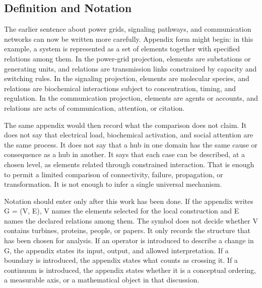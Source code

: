 \documentclass[11pt,a4paper,openany]{book}
\begin{document}
\subsection{Definition and Notation}
The earlier sentence about power grids, signaling pathways, and communication networks can now be written more carefully. Appendix form might begin: in this example, a system is represented as a set of elements together with specified relations among them. In the power-grid projection, elements are substations or generating units, and relations are transmission links constrained by capacity and switching rules. In the signaling projection, elements are molecular species, and relations are biochemical interactions subject to concentration, timing, and regulation. In the communication projection, elements are agents or accounts, and relations are acts of communication, attention, or citation. \cite{raf_networks,bak_soc}\par
The same appendix would then record what the comparison does not claim. It does not say that electrical load, biochemical activation, and social attention are the same process. It does not say that a hub in one domain has the same cause or consequence as a hub in another. It says that each case can be described, at a chosen level, as elements related through constrained interaction. That is enough to permit a limited comparison of connectivity, failure, propagation, or transformation. It is not enough to infer a single universal mechanism.\par
Notation should enter only after this work has been done. If the appendix writes G = (V, E), V names the elements selected for the local construction and E names the declared relations among them. The symbol does not decide whether V contains turbines, proteins, people, or papers. It only records the structure that has been chosen for analysis. If an operator is introduced to describe a change in G, the appendix states its input, output, and allowed interpretation. If a boundary is introduced, the appendix states what counts as crossing it. If a continuum is introduced, the appendix states whether it is a conceptual ordering, a measurable axis, or a mathematical object in that discussion.\par
\end{document}

